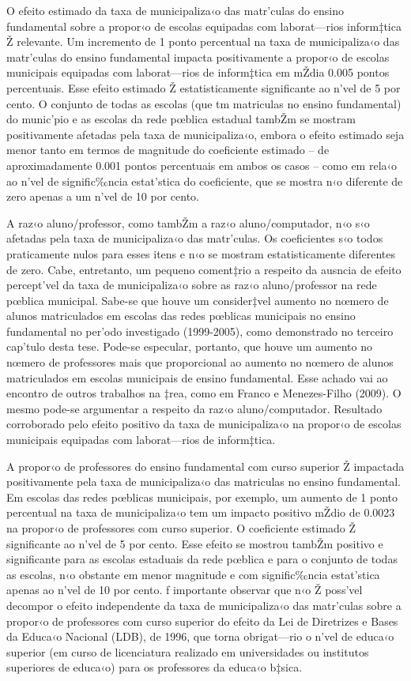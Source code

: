 \documentclass[a4paper, 12pt]{article}
\begin{document}
O efeito estimado da taxa de municipaliza‹o das matr’culas do ensino fundamental sobre a propor‹o de escolas equipadas com laborat—rios inform‡tica Ž relevante. Um incremento de 1 ponto percentual na taxa de municipaliza‹o das matr’culas do ensino fundamental impacta positivamente a propor‹o de escolas municipais equipadas com laborat—rios de inform‡tica em mŽdia 0.005 pontos percentuais. Esse efeito estimado Ž estatisticamente significante ao n’vel de 5 por cento. O conjunto de todas as escolas (que tm matriculas no ensino fundamental) do munic’pio e as escolas da rede pœblica estadual tambŽm se mostram positivamente afetadas pela taxa de municipaliza‹o, embora o efeito estimado seja menor tanto em termos de magnitude do coeficiente estimado -- de aproximadamente 0.001 pontos percentuais em ambos os casos -- como em rela‹o ao n’vel de signific‰ncia estat’stica do coeficiente, que se mostra n‹o diferente de zero apenas a um n’vel de 10 por cento. 

A raz‹o aluno/professor, como tambŽm a raz‹o aluno/computador, n‹o s‹o afetadas pela taxa de municipaliza‹o das matr’culas. Os coeficientes s‹o todos praticamente nulos para esses itens e n‹o se mostram estatisticamente diferentes de zero. Cabe, entretanto, um pequeno coment‡rio a respeito da ausncia de efeito percept’vel da taxa de municipaliza‹o sobre as raz‹o aluno/professor na rede pœblica municipal. Sabe-se que houve um consider‡vel aumento no nœmero de alunos matriculados em escolas das redes pœblicas municipais no ensino fundamental no per’odo investigado (1999-2005), como demonstrado no terceiro cap’tulo desta tese.  Pode-se especular, portanto, que houve um aumento no nœmero de professores mais que proporcional ao aumento no nœmero de alunos matriculados em escolas municipais de ensino fundamental. Esse achado vai ao encontro de outros trabalhos na ‡rea, como em Franco e Menezes-Filho (2009). O mesmo pode-se argumentar a respeito da raz‹o aluno/computador. Resultado corroborado pelo efeito positivo da taxa de municipaliza‹o na propor‹o de escolas municipais equipadas com laborat—rios de inform‡tica. 

A propor‹o de professores do ensino fundamental com curso superior Ž impactada positivamente pela taxa de municipaliza‹o das matriculas no ensino fundamental. Em escolas das redes pœblicas municipais, por exemplo, um aumento de 1 ponto percentual na taxa de municipaliza‹o tem um impacto positivo mŽdio de 0.0023 na propor‹o de professores com curso superior. O coeficiente estimado Ž significante ao n’vel de 5 por cento. Esse efeito se mostrou tambŽm positivo e significante para as escolas estaduais da rede pœblica e para o conjunto de todas as escolas, n‹o obstante em menor magnitude e com signific‰ncia estat’stica apenas ao n’vel de 10 por cento. ƒ importante observar que n‹o Ž poss’vel decompor o efeito independente da taxa de municipaliza‹o das matr’culas sobre a propor‹o de professores com curso superior do efeito da Lei de Diretrizes e Bases da Educa‹o Nacional (LDB), de 1996, que torna obrigat—rio o n’vel de educa‹o superior (em curso de licenciatura realizado em universidades ou institutos superiores de educa‹o) para os professores da educa‹o b‡sica. 
\end{document}
